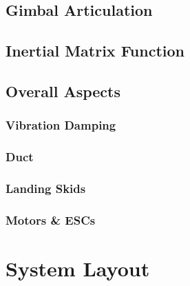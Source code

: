 \subsection{Gimbal Articulation}
\label{subsec:proto.design.actuation}
\subsection{Inertial Matrix Function}
\label{subsec:proto.design.inertia}
\subsection{Overall Aspects}
\label{subsec:proto.design.aspects}
\subsubsection{Vibration Damping}
\subsubsection{Duct}
\subsubsection{Landing Skids}
\subsubsection{Motors \& ESCs}

\section{System Layout}
\label{sec:proto.layout}
